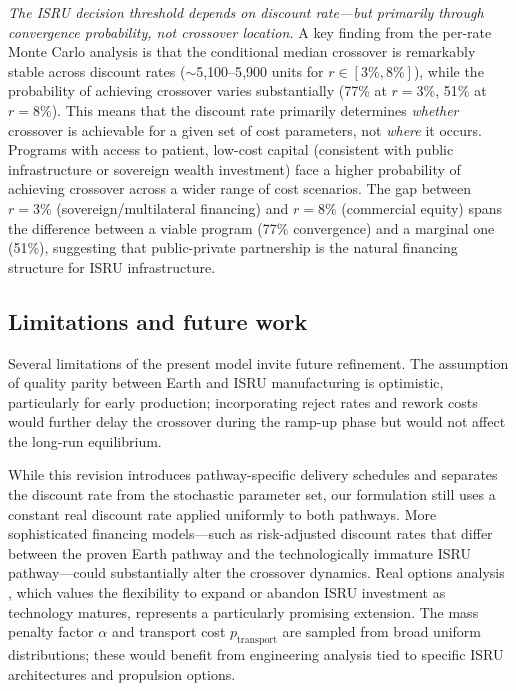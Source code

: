 \documentclass[preprint,12pt]{elsarticle}
\begin{document}
\emph{The ISRU decision threshold depends on discount rate---but primarily through convergence probability, not crossover location.} A key finding from the per-rate Monte Carlo analysis is that the conditional median crossover is remarkably stable across discount rates ($\sim$5{,}100--5{,}900 units for $r \in [3\%, 8\%]$), while the probability of achieving crossover varies substantially (77\% at $r = 3\%$, 51\% at $r = 8\%$). This means that the discount rate primarily determines \emph{whether} crossover is achievable for a given set of cost parameters, not \emph{where} it occurs. Programs with access to patient, low-cost capital (consistent with public infrastructure or sovereign wealth investment) face a higher probability of achieving crossover across a wider range of cost scenarios. The gap between $r = 3\%$ (sovereign/multilateral financing) and $r = 8\%$ (commercial equity) spans the difference between a viable program (77\% convergence) and a marginal one (51\%), suggesting that public-private partnership is the natural financing structure for ISRU infrastructure.

\subsection{Limitations and future work}

Several limitations of the present model invite future refinement. The assumption of quality parity between Earth and ISRU manufacturing is optimistic, particularly for early production; incorporating reject rates and rework costs would further delay the crossover during the ramp-up phase but would not affect the long-run equilibrium.

While this revision introduces pathway-specific delivery schedules and separates the discount rate from the stochastic parameter set, our formulation still uses a constant real discount rate applied uniformly to both pathways. More sophisticated financing models---such as risk-adjusted discount rates that differ between the proven Earth pathway and the technologically immature ISRU pathway---could substantially alter the crossover dynamics. Real options analysis \cite{dixit1994}, which values the flexibility to expand or abandon ISRU investment as technology matures, represents a particularly promising extension. The mass penalty factor $\alpha$ and transport cost $p_{\mathrm{transport}}$ are sampled from broad uniform distributions; these would benefit from engineering analysis tied to specific ISRU architectures and propulsion options.
\end{document}
